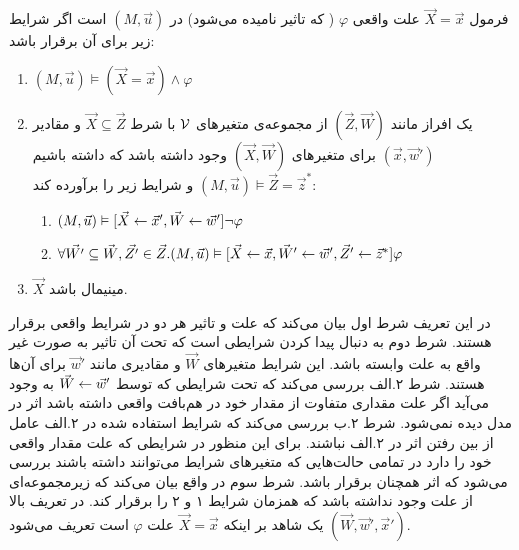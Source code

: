 \begin{definition}
      \label{def:cause}
      فرمول
      $\vec X = \vec x$
      علت واقعی
      $\varphi$
      (
      که تاثیر
      نامیده می‌شود)
      در
      $(M,\vec{u})$
      است
      اگر شرایط زیر برای آن برقرار باشد:
      \begin{enumerate}
            \item $(M,\vec{u}) \vDash (\vec{X} = \vec{x}) \wedge \varphi$
            \item یک افراز مانند
                  $(\vec{Z},\vec{W})$
                  از مجموعه‌ی متغیر‌های
                  $\mathcal{V}$
                  با شرط
                  $\vec{X} \subseteq \vec{Z}$
                  و مقادیر
                  $(\vec{x},\vec{w}')$
                  برای متغیر‌های
                  $(\vec{X},\vec{W})$
                  وجود داشته باشد که داشته باشیم
                  $(M,\vec{u})\vDash \vec{Z} = \vec{z}^*$
                  و شرایط زیر را برآورده کند:
                  \begin{enumerate}
                        \item $(M,\vec u)\vDash[\vec{X}\leftarrow\vec{x}',\vec{W}\leftarrow\vec{w}']
                                    \neg \varphi$
                        \item $\forall \vec{W'} \subseteq \vec{W},\vec{Z'}\in \vec{Z}.
                                    (M,\vec{u})\vDash [\vec X\leftarrow\vec x,\vec{W}'\leftarrow \vec{w}',\vec{Z}'\leftarrow \vec{z}^*]\varphi$
                  \end{enumerate}
            \item $\vec X$
                  مینیمال باشد.
      \end{enumerate}
\end{definition}
در این تعریف شرط اول بیان می‌کند که علت و تاثیر هر دو در شرایط واقعی برقرار هستند.
شرط دوم به دنبال پیدا کردن شرایطی است که تحت آن تاثیر به صورت غیر واقع به علت وابسته باشد.
این شرایط متغیرهای
$\vec W$
و مقادیری مانند
$\vec{w}'$
برای آن‌ها هستند.
شرط ۲.الف بررسی می‌کند که تحت شرایطی که توسط
$\vec W \leftarrow \vec{w}'$
به وجود می‌آید اگر علت مقداری متفاوت از مقدار خود در هم‌بافت واقعی داشته باشد اثر در مدل دیده نمی‌شود.
شرط ۲.ب بررسی می‌کند که شرایط
استفاده شده در ۲.الف عامل
از بین رفتن اثر در ۲.الف نباشند.
برای این منظور در شرایطی که علت مقدار واقعی خود را دارد در تمامی حالت‌هایی که متغیر‌های شرایط می‌توانند داشته باشند بررسی می‌شود که اثر همچنان برقرار باشد.
شرط سوم در واقع بیان می‌کند که زیرمجموعه‌ای از علت وجود نداشته باشد که همزمان شرایط ۱ و ۲ را برقرار کند.
در تعریف بالا
$(\vec W, \vec w',\vec x')$
یک شاهد
بر اینکه
$\vec X = \vec x$
علت
$\varphi$
است تعریف می‌شود.

